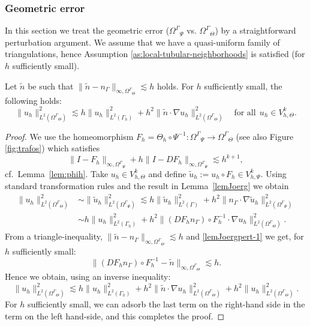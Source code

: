 \documentclass[final]{siamltex}
\begin{document}
\subsubsection{Geometric error} \label{sec:approxnormal}
In this section we treat the geometric error (${\Omega^{\Gamma}}_\Psi$ vs. ${\Omega^{\Gamma}}_\Theta$) by a straightforward perturbation argument.
We assume that we have a quasi-uniform family of triangulations, hence Assumption \ref{as:local-tubular-neighborhoods} is satisfied (for $h$ sufficiently small).
\begin{lemma} \label{lemJoergpert}
 Let $\tilde n$ be such that $\|\tilde n - n_\Gamma\|_{\infty,{\Omega^{\Gamma}}_\Theta} \lesssim h$ holds. For $h$ sufficiently small, the following holds:
  \begin{equation} \label{estpert}
    \|u_h\|_{L^2({\Omega^{\Gamma}}_\Theta)}^2 \lesssim h \|u_h\|_{L^2(\Gamma_h)}^2 + h^2 \|\tilde n \cdot \nabla u_h\|_{L^2({\Omega^{\Gamma}}_\Theta)}^2 \quad \text{for all}~~u_h \in V_{h,\Theta}^k.
  \end{equation}
\end{lemma}

\begin{proof}
We use the homeomorphism $F_h = \Theta_h \circ \Psi^{-1}: {\Omega^{\Gamma}}_\Psi \to {\Omega^{\Gamma}}_\Theta$ (see also Figure \ref{fig:trafos}) which satisfies
\begin{equation}\label{lemJoergpert-1}
  \|I- F_h \|_{\infty,{\Omega^{\Gamma}}_\Psi} + h\|I- DF_h \|_{\infty,{\Omega^{\Gamma}}_\Psi} \lesssim h^{k+1},
\end{equation}
cf.~Lemma~\ref{lem:phih}. Take $u_h \in V_{h,\Theta}^k$ and define $\tilde u_h:=u_h \circ F_h\in V_{h,\Psi}^k$. Using standard transformation rules and the result in Lemma~\ref{lemJoerg} we obtain
\begin{align*}
  \|u_h\|_{L^2({\Omega^{\Gamma}}_\Theta)}^2 & \sim \|\tilde u_h \|_{L^2({\Omega^{\Gamma}}_\Psi)}^2 \lesssim h \|\tilde u_h\|_{L^2(\Gamma)}^2 + h^2 \|n_\Gamma \cdot \nabla \tilde u_h\|_{L^2({\Omega^{\Gamma}}_\Psi)}^2 \\
  & \sim h \| u_h\|_{L^2(\Gamma_h)}^2 + h^2 \|(DF_h n_\Gamma)\circ F_h^{-1} \cdot \nabla u_h\|_{L^2({\Omega^{\Gamma}}_\Theta)}^2 .
\end{align*}
From a triangle-inequality, $\|\tilde n - n_\Gamma\|_{\infty,{\Omega^{\Gamma}}_\Theta} \lesssim h$ and \eqref{lemJoergpert-1} we get, for $h$ sufficiently small:
\[
 \|(DF_h n_\Gamma)\circ F_h^{-1} - \tilde n\|_{\infty, {\Omega^{\Gamma}}_\Theta} \lesssim
 h.
\]
Hence we obtain, using an inverse inequality:
\[
 \|u_h\|_{L^2({\Omega^{\Gamma}}_\Theta)}^2 \lesssim h \| u_h\|_{L^2(\Gamma_h)}^2 + h^2 \| \tilde n \cdot \nabla u_h\|_{L^2({\Omega^{\Gamma}}_\Theta)}^2 + h^2 \|u_h\|_{L^2({\Omega^{\Gamma}}_\Theta)}^2.
\]
For $h$ sufficiently small, we can adsorb the last term on the right-hand side in the term on the left hand-side, and this completes the proof.
\end{proof}
\end{document}
